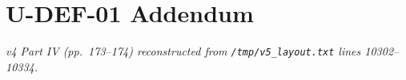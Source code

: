 \part{U-DEF-01 Addendum}
\noindent\textit{v4 Part IV (pp.~173--174) reconstructed from
\texttt{/tmp/v5\_layout.txt} lines 10302--10334.}



